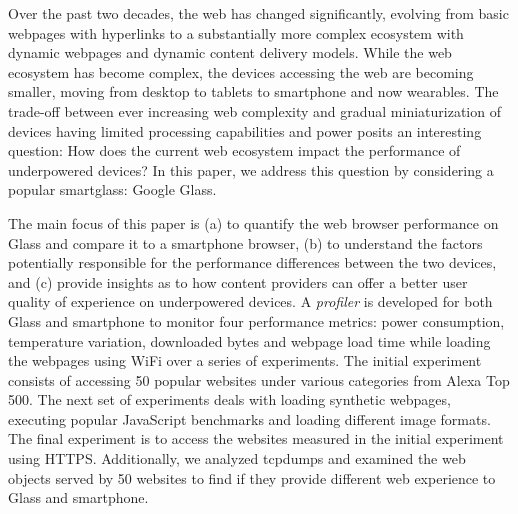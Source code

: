 \documentclass{sig-alternate-10pt}
\begin{document}
Over the past two decades, the web has changed significantly, evolving from  basic webpages with hyperlinks to a substantially more complex ecosystem with dynamic webpages and dynamic content delivery models. While the web ecosystem has become complex, the devices accessing the web are becoming smaller, moving from desktop to tablets to smartphone and now wearables. The trade-off between ever increasing web complexity and gradual miniaturization of devices having limited processing capabilities and power posits an interesting question: How does the current web ecosystem  impact the performance of underpowered devices? In this paper, we address this question by considering a popular smartglass: Google  Glass. 



The main focus of this paper is (a) to quantify the web browser performance on Glass and  compare it to a smartphone browser,  (b) to understand   the  factors  potentially responsible for the performance differences between the two devices, and (c) provide insights as to how content providers can offer a better user quality of experience on underpowered devices. A \textit{profiler} is developed for both Glass and smartphone to monitor four performance metrics:  power consumption, temperature variation, downloaded bytes and webpage load time while loading the webpages using WiFi over a series of experiments.  The initial experiment consists of accessing 50 popular    websites under various categories from Alexa Top 500.  The next set of experiments deals with loading synthetic webpages, executing popular JavaScript benchmarks and loading different image formats.   The final experiment is to access the websites measured in the initial experiment using HTTPS.  Additionally, we analyzed tcpdumps and examined  the  web objects served by  50 websites  to find if they  provide different web experience to Glass and smartphone.    

  
\end{document}
